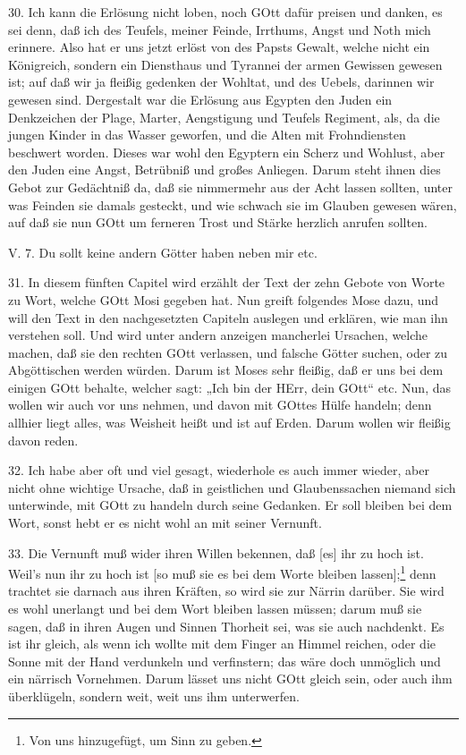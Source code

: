 30. Ich kann die Erlösung nicht loben, noch GOtt dafür preisen und danken, es sei denn, daß ich des Teufels, meiner Feinde, Irrthums, Angst und Noth mich erinnere. Also hat er uns jetzt erlöst von des Papsts Gewalt, welche nicht ein Königreich, sondern ein Diensthaus und Tyrannei der armen Gewissen gewesen ist; auf daß wir ja fleißig gedenken der Wohltat, und des Uebels, darinnen wir gewesen sind. Dergestalt war die Erlösung aus Egypten den Juden ein Denkzeichen der Plage, Marter, Aengstigung und Teufels Regiment, als, da die jungen Kinder in das Wasser geworfen, und die Alten mit Frohndiensten beschwert worden. Dieses war wohl den Egyptern ein Scherz und Wohlust, aber den Juden eine Angst, Betrübniß und großes Anliegen. Darum steht ihnen dies Gebot zur Gedächtniß da, daß sie nimmermehr aus der Acht lassen sollten, unter was Feinden sie damals gesteckt, und wie schwach sie im Glauben gewesen wären, auf daß sie nun GOtt um ferneren Trost und Stärke herzlich anrufen sollten.

\begin{schriftzitat}
V. 7. Du sollt keine andern Götter haben neben mir etc.
\end{schriftzitat}

31. In diesem fünften Capitel wird erzählt der Text der zehn Gebote von Worte zu Wort, welche GOtt Mosi gegeben hat. Nun greift folgendes Mose dazu, und will den Text in den nachgesetzten Capiteln auslegen und erklären, wie man ihn verstehen soll. Und wird unter andern anzeigen mancherlei Ursachen, welche machen, daß sie den rechten GOtt verlassen, und falsche Götter suchen, oder zu Abgöttischen werden würden. Darum ist Moses sehr fleißig, daß er uns bei dem einigen GOtt behalte, welcher
sagt: „Ich bin der HErr, dein GOtt“ etc. Nun, das wollen wir auch vor uns nehmen, und davon mit GOttes Hülfe handeln; denn allhier liegt alles, was Weisheit heißt und ist auf Erden. Darum wollen wir fleißig davon reden.

32. Ich habe aber oft und viel gesagt, wiederhole es auch immer wieder, aber nicht ohne wichtige Ursache, daß in geistlichen und Glaubenssachen niemand sich unterwinde, mit GOtt zu handeln durch seine Gedanken. Er soll bleiben bei dem Wort, sonst hebt er es nicht wohl an mit seiner Vernunft.

33. Die Vernunft muß wider ihren Willen bekennen, daß [es] ihr zu hoch ist. Weil’s nun ihr zu hoch ist [so muß sie es bei dem Worte bleiben lassen];\footnote{Von uns hinzugefügt, um Sinn zu geben.} denn trachtet sie darnach aus ihren Kräften, so wird sie zur Närrin darüber. Sie wird es wohl unerlangt und bei dem Wort bleiben lassen müssen; darum muß sie sagen, daß in ihren Augen und Sinnen Thorheit sei, was sie auch nachdenkt. Es ist ihr gleich, als wenn ich wollte mit dem Finger an Himmel reichen, oder die Sonne mit der Hand verdunkeln und verfinstern; das wäre doch unmöglich und ein närrisch Vornehmen. Darum lässet uns nicht GOtt gleich sein, oder auch ihm überklügeln, sondern weit, weit uns ihm unterwerfen.

